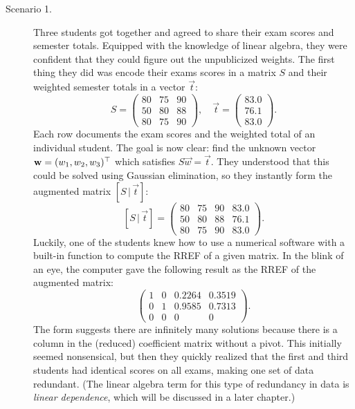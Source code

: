 \documentclass{ximera}
\begin{document}
\begin{example}
  \begin{description}
  \item[Scenario 1.] Three students got together and agreed to share
    their exam scores and semester totals. Equipped with the knowledge
    of linear algebra, they were confident that they could figure out
    the unpublicized weights. The first thing they did was encode
    their exams scores in a matrix $S$ and their weighted semester
    totals in a vector $\vec{t}$:
    \[
      S =
      \begin{pmatrix}
        80 & 75 & 90 \\
        50 & 80 & 88 \\
        80 & 75 & 90
      \end{pmatrix},\quad
      \vec{t} =
      \begin{pmatrix}
        83.0 \\ 76.1 \\ 83.0
      \end{pmatrix}.
    \]
    Each row documents the exam scores and the weighted total of an
    individual student. The goal is now clear: find the unknown vector
    $\mathbf{w} = (w_1, w_2, w_3)^\top$ which satisfies
    $S\vec{w} = \vec{t}$. They understood that this could be solved
    using Gaussian elimination, so they instantly form the augmented
    matrix $[S \,|\, \vec{t}]$:
    \[
      [S \,|\, \vec{t}] =
      \left(
        \begin{array}{ccc|c}
          80 & 75 & 90 & 83.0 \\
          50 & 80 & 88 & 76.1 \\
          80 & 75 & 90 & 83.0
        \end{array}
      \right).
    \]
    Luckily, one of the students knew how to use a numerical software
    with a built-in function to compute the RREF of a given matrix. In
    the blink of an eye, the computer gave the following result as the
    RREF of the augmented matrix:
    \[
      \left(
        \begin{array}{ccc|c}
          1 & 0 & 0.2264 & 0.3519 \\
          0 & 1 & 0.9585 & 0.7313 \\
          0 & 0 & 0 & 0
        \end{array}
      \right).
    \]
    The form suggests there are infinitely many solutions because
    there is a column in the (reduced) coefficient matrix without a
    pivot. This initially seemed nonsensical, but then they quickly
    realized that the first and third students had identical scores on
    all exams, making one set of data redundant. (The linear algebra
    term for this type of redundancy in data is \textit{linear
      dependence}, which will be discussed in a later chapter.)


\end{description}
\end{example}
\end{document}
